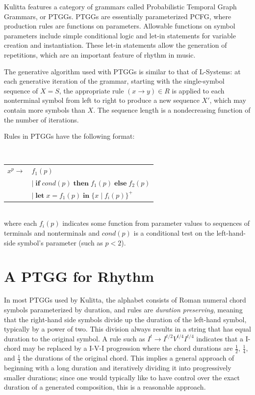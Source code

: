 \documentclass{article}
\begin{document}
Kulitta features a category of grammars called Probabilistic Temporal Graph Grammars\cite{quick2013farm, quick_thesis}, or PTGGs. PTGGs are essentially parameterized PCFG, where production rules are functions on parameters. Allowable functions on symbol parameters include simple conditional logic and let-in statements for variable creation and instantiation. These let-in statements allow the generation of repetitions, which are an important feature of rhythm in music.

The generative algorithm used with PTGGs is similar to that of L-Systems: at each generative iteration of the grammar, starting with the single-symbol sequence of $X = S$, the appropriate rule $(x \rightarrow y) \in R$ is applied to each nonterminal symbol from left to right to produce a new sequence $X'$, which may contain more symbols than $X$. The sequence length is a nondecreasing function of the number of iterations. 


Rules in PTGGs have the following format:

$\;$ \\
\begin{tabular}{ll}
$x^p \rightarrow$ & $f_{1}(p)$ \\
$\;$ & $ \vert \;  \textbf{if} \; cond(p) \; \textbf{then} \; f_{1}(p) \; \textbf{else} \; f_{2}(p)$ \\
$\;$ & $\vert \; \textbf{let} \; x = f_{1}(p) \; \textbf{in} \; \{x \; | \; f_{i}(p)\}^{+}$ \\
\end{tabular} $\;$ \\

\noindent where each $f_{i}(p)$ indicates some function from parameter values to sequences of terminals and nonterminals and $cond(p)$ is a conditional test on the left-hand-side symbol's parameter (such as $p<2$).


\section{A PTGG for Rhythm}


In most PTGGs used by Kulitta, the alphabet consists of Roman numeral chord symbols parameterized by duration, and rules are \emph{duration preserving}, meaning that the right-hand side symbols divide up the duration of the left-hand symbol, typically by a power of two. This division always results in a string that has equal duration to the original symbol. A rule such as $I^{t} \rightarrow I^{t/2} V^{t/4} I^{t/4}$ indicates that a I-chord may be replaced by a I-V-I progression where the chord durations are $\frac{1}{2}$, $\frac{1}{4}$, and $\frac{1}{4}$ the durations of the original chord. This implies a general approach of beginning with a long duration and iteratively dividing it into progressively smaller durations; since one would typically like to have control over the exact duration of a generated composition, this is a reasonable approach.
\end{document}
